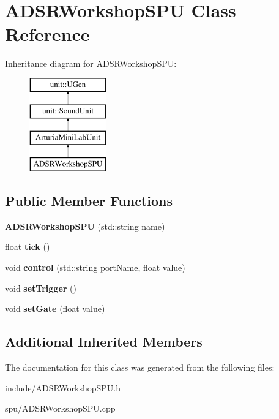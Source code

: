 \hypertarget{classADSRWorkshopSPU}{\section{A\-D\-S\-R\-Workshop\-S\-P\-U Class Reference}
\label{classADSRWorkshopSPU}
}
Inheritance diagram for A\-D\-S\-R\-Workshop\-S\-P\-U\-:\begin{figure}[H]
\begin{center}
\leavevmode
\includegraphics[height=4.000000cm]{classADSRWorkshopSPU}
\end{center}
\end{figure}
\subsection*{Public Member Functions}
\begin{DoxyCompactItemize}
\item 
\hypertarget{classADSRWorkshopSPU_a2140f477c0bdc9fac9b66a6c103bb126}{{\bfseries A\-D\-S\-R\-Workshop\-S\-P\-U} (std\-::string name)}\label{classADSRWorkshopSPU_a2140f477c0bdc9fac9b66a6c103bb126}

\item 
\hypertarget{classADSRWorkshopSPU_a8ec50457bbb3455b797f87cdb9988164}{float {\bfseries tick} ()}\label{classADSRWorkshopSPU_a8ec50457bbb3455b797f87cdb9988164}

\item 
\hypertarget{classADSRWorkshopSPU_af50b5a155375a444b9ebfe154b643409}{void {\bfseries control} (std\-::string port\-Name, float value)}\label{classADSRWorkshopSPU_af50b5a155375a444b9ebfe154b643409}

\item 
\hypertarget{classADSRWorkshopSPU_a961200f724c466c0dc0a0156dd01cbcc}{void {\bfseries set\-Trigger} ()}\label{classADSRWorkshopSPU_a961200f724c466c0dc0a0156dd01cbcc}

\item 
\hypertarget{classADSRWorkshopSPU_a51be23dcf951c1e752c218bf3c0be9bd}{void {\bfseries set\-Gate} (float value)}\label{classADSRWorkshopSPU_a51be23dcf951c1e752c218bf3c0be9bd}

\end{DoxyCompactItemize}
\subsection*{Additional Inherited Members}


The documentation for this class was generated from the following files\-:\begin{DoxyCompactItemize}
\item 
include/A\-D\-S\-R\-Workshop\-S\-P\-U.\-h\item 
spu/A\-D\-S\-R\-Workshop\-S\-P\-U.\-cpp\end{DoxyCompactItemize}
